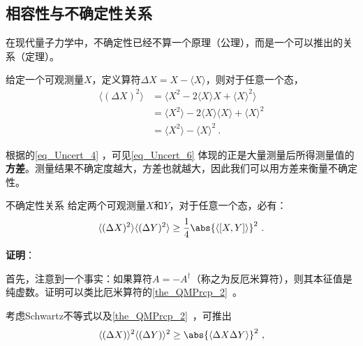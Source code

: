 


\subsection{相容性与不确定性关系}

在现代量子力学中，不确定性已经不算一个原理（公理），而是一个可以推出的关系（定理）。

给定一个可观测量$X$，定义算符$\Delta X=X-\langle X \rangle$，则对于任意一个态，
\begin{equation}\label{eq_Uncert_6}
\begin{aligned}
\langle (\Delta X)^2 \rangle &= \langle X^2-2\langle X \rangle X + \langle X \rangle^2 \rangle\\
&=\langle X^2\rangle -2\langle X \rangle \langle X \rangle + \langle X \rangle^2\\
&=\langle X^2 \rangle - \langle X \rangle^2~.
\end{aligned}
\end{equation}

根据的\autoref{eq_Uncert_4} ，可见\autoref{eq_Uncert_6} 体现的正是大量测量后所得测量值的\textbf{方差}。测量结果不确定度越大，方差也就越大，因此我们可以用方差来衡量不确定性。

\begin{theorem}{不确定性关系}\label{the_Uncert_1}
给定两个可观测量$X$和$Y$，对于任意一个态，必有：
\begin{equation}\label{eq_Uncert_9}
\langle (\Delta X)^2 \rangle\langle (\Delta Y)^2 \rangle \geq \frac{1}{4}\abs{\langle [X, Y] \rangle}^2~.
\end{equation}
\end{theorem}


\textbf{证明}：

首先，注意到一个事实：如果算符$A=-A^\dagger$（称之为反厄米算符），则其本征值是纯虚数。证明可以类比厄米算符的\autoref{the_QMPrcp_2}~。

考虑Schwartz不等式以及\autoref{the_QMPrcp_2}~，可推出
\begin{equation}\label{eq_Uncert_7}
\langle (\Delta X)\rangle^2\langle (\Delta Y)\rangle^2\geq \abs{\langle \Delta X \Delta Y \rangle}^2~,
\end{equation}

